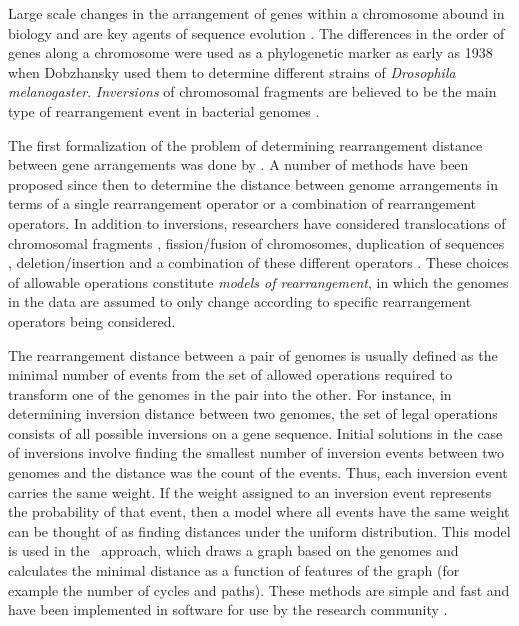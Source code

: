 \documentclass[12pt,a4paper]{amsart}
\numberwithin{equation}{section}
\begin{document}
Large scale changes in the arrangement of genes within a chromosome abound in biology and are key agents of sequence evolution \citep{beckmann2007copy,belda2005genome}. The differences in the order of genes along a chromosome were used as a phylogenetic marker as early as 1938~\citep{dobzhansky1938inversions} when Dobzhansky used them to determine different strains of \emph{Drosophila melanogaster}. \emph{Inversions} of chromosomal fragments are believed to be the main type of rearrangement event in bacterial genomes \citep{belda2005genome}.  

The first formalization of the problem of determining rearrangement distance between gene arrangements was done by \citet{watterson1982chromosome}. A number of methods have been proposed since then to determine the distance between genome arrangements in terms of a single rearrangement operator or a combination of rearrangement operators. In addition to inversions, researchers have considered translocations of chromosomal fragments \citep{bafna1995sorting,bafna1998sorting,yin2013sorting}, fission/fusion of chromosomes, duplication of sequences \citep{chaudhuri2006tandem}, deletion/insertion and a combination of these different operators \citep{yancopoulos2005efficient}. These choices of allowable operations constitute \emph{models of rearrangement}, in which the genomes in the data are assumed to only change according to specific rearrangement operators being considered.

The rearrangement distance between a pair of genomes is usually defined as the minimal number of events from the set of allowed operations required to transform one of the genomes in the pair into the other. For instance, in determining inversion distance between two genomes, the set of legal operations consists of all possible inversions on a gene sequence.  Initial solutions in the case of inversions involve finding the smallest number of inversion events between two genomes and the distance was the count of the events. Thus, each inversion event carries the same weight. If the weight assigned to an inversion event represents the probability of that event, then a model where all events have the same weight can be thought of as finding distances under the uniform distribution.  This model is used in the~\citet{hannenhalli1999transforming} approach, which draws a graph based on the genomes and calculates the minimal distance as a function of features of the graph (for example the number of cycles and paths). 
% 
These methods are simple and fast and have been implemented in software for use by the research community \citep{sankoff1991derange,tesler2002grimm,shao2014exact}. 
\end{document}
